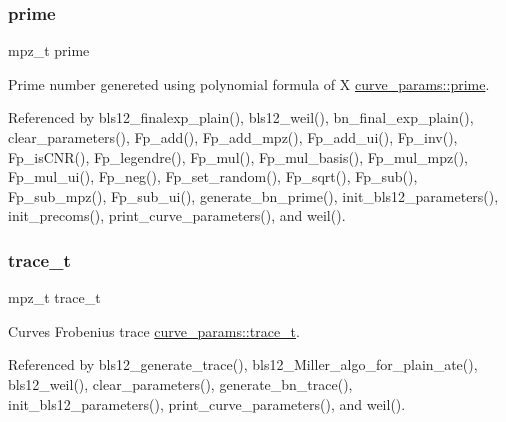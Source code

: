 \mbox{\label{structcurve__params_aba84e227126f9481f3f1a07737f563c2}} 
\subsubsection{\texorpdfstring{prime}{prime}}
{\footnotesize\ttfamily mpz\+\_\+t prime}

Prime number genereted using polynomial formula of X \hyperlink{structcurve__params_aba84e227126f9481f3f1a07737f563c2}{curve\+\_\+params\+::prime}. 

Referenced by bls12\+\_\+finalexp\+\_\+plain(), bls12\+\_\+weil(), bn\+\_\+final\+\_\+exp\+\_\+plain(), clear\+\_\+parameters(), Fp\+\_\+add(), Fp\+\_\+add\+\_\+mpz(), Fp\+\_\+add\+\_\+ui(), Fp\+\_\+inv(), Fp\+\_\+is\+C\+N\+R(), Fp\+\_\+legendre(), Fp\+\_\+mul(), Fp\+\_\+mul\+\_\+basis(), Fp\+\_\+mul\+\_\+mpz(), Fp\+\_\+mul\+\_\+ui(), Fp\+\_\+neg(), Fp\+\_\+set\+\_\+random(), Fp\+\_\+sqrt(), Fp\+\_\+sub(), Fp\+\_\+sub\+\_\+mpz(), Fp\+\_\+sub\+\_\+ui(), generate\+\_\+bn\+\_\+prime(), init\+\_\+bls12\+\_\+parameters(), init\+\_\+precoms(), print\+\_\+curve\+\_\+parameters(), and weil().

\mbox{\label{structcurve__params_a92e90157be25b87a0cd9d55883664fdf}} 
\subsubsection{\texorpdfstring{trace\+\_\+t}{trace\_t}}
{\footnotesize\ttfamily mpz\+\_\+t trace\+\_\+t}

Curves Frobenius trace \hyperlink{structcurve__params_a92e90157be25b87a0cd9d55883664fdf}{curve\+\_\+params\+::trace\+\_\+t}. 

Referenced by bls12\+\_\+generate\+\_\+trace(), bls12\+\_\+\+Miller\+\_\+algo\+\_\+for\+\_\+plain\+\_\+ate(), bls12\+\_\+weil(), clear\+\_\+parameters(), generate\+\_\+bn\+\_\+trace(), init\+\_\+bls12\+\_\+parameters(), print\+\_\+curve\+\_\+parameters(), and weil().

\mbox{\label{structcurve__params_aafd3c8facd30604e0786d7d2885f373d}} 

